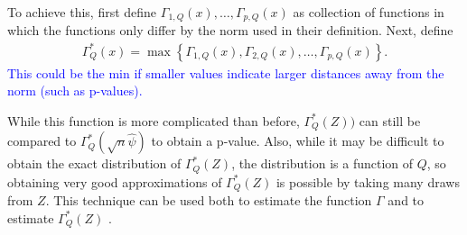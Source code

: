 \documentclass{article}
\newcommand{\norm}{f}
\newcommand{\rvv}{Z}
\newcommand{\distv}{Q}
\begin{document}
To achieve this, first define $\Gamma_{1, \distv}(x), \dots, \Gamma_{p, \distv}(x)$ as collection of functions in which the functions only differ by the norm used in their definition. Next, define
\begin{align*}
	\Gamma^*_\distv(x) = \max\left\{\Gamma_{1, \distv}(x), \Gamma_{2, \distv}(x), \dots, \Gamma_{p, \distv}(x)\right\}.
\end{align*}
\textcolor{blue}{This could be the min if smaller values indicate larger distances away from the norm (such as p-values).}  

While this function is more complicated than before,  $\Gamma^*_{\distv}(\rvv))$ can still be compared to $\Gamma^*_{\distv}(\sqrt{n}\hat{\psi})$ to obtain a p-value. Also, while it may be difficult to obtain the exact distribution of $\Gamma_\distv^*(\rvv)$, the distribution is a function of $\distv$, so obtaining very good approximations of $\Gamma_\distv^*(\rvv)$ is possible by taking many draws from $\rvv$. This technique can be used both to estimate the function $\Gamma$ and to estimate $\Gamma^*_\distv(\rvv)$ .


\end{document}
